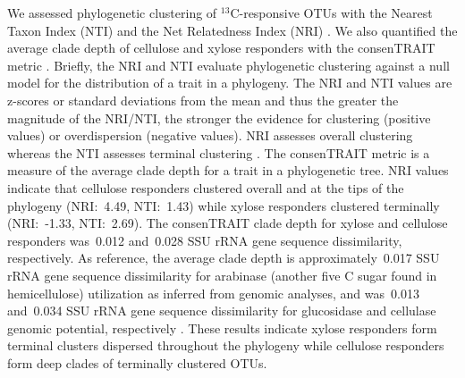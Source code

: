 We assessed phylogenetic clustering of $^{13}$C-responsive OTUs with the
Nearest Taxon Index (NTI) and the Net Relatedness Index (NRI)
\citep{Webb2000}. We also quantified the average clade depth of cellulose and
xylose responders with the consenTRAIT metric \citep{Martiny2013}. Briefly, the
NRI and NTI evaluate phylogenetic clustering against a null model for the
distribution of a trait in a phylogeny. The NRI and NTI values are z-scores or
standard deviations from the mean and thus the greater the magnitude of the
NRI/NTI, the stronger the evidence for clustering (positive values) or
overdispersion (negative values). NRI assesses overall clustering whereas the
NTI assesses terminal clustering \citep{Evans2014a}. The consenTRAIT metric is
a measure of the average clade depth for a trait in a phylogenetic tree. NRI
values indicate that cellulose responders clustered overall and at the tips of
the phylogeny (NRI:~4.49, NTI:~1.43) while xylose responders clustered
terminally (NRI:~-1.33, NTI:~2.69). The consenTRAIT clade depth for xylose and
cellulose responders was~0.012 and~0.028 SSU rRNA gene sequence dissimilarity,
respectively. As reference, the average clade depth is approximately~0.017 SSU
rRNA gene sequence dissimilarity for arabinase (another five C sugar found in
hemicellulose) utilization as inferred from genomic analyses, and was~0.013
and~0.034 SSU rRNA gene sequence dissimilarity for glucosidase and cellulase
genomic potential, respectively \citep{Martiny2013,Berlemont2013}. These
results indicate xylose responders form terminal clusters dispersed throughout
the phylogeny while cellulose responders form deep clades of terminally
clustered OTUs.
